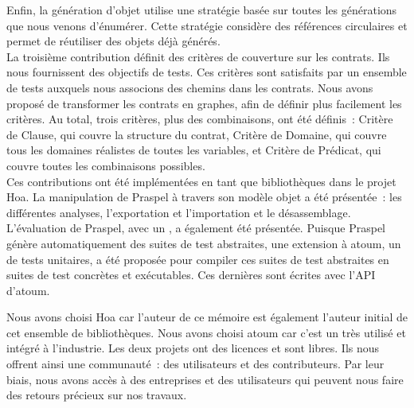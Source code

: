 Enfin, la génération d'objet utilise une stratégie basée sur toutes les
générations que nous venons d'énumérer. Cette stratégie considère des références
circulaires et permet de réutiliser des objets déjà générés. \\

La troisième contribution définit des critères de couverture sur les contrats.
Ils nous fournissent des objectifs de tests. Ces critères sont satisfaits par un
ensemble de tests auxquels nous associons des chemins dans les contrats. Nous
avons proposé de transformer les contrats en graphes, afin de définir plus
facilement les critères. Au total, trois critères, plus des combinaisons, ont
été définis~: Critère de Clause, qui couvre la structure du contrat, Critère de
Domaine, qui couvre tous les domaines réalistes de toutes les variables, et
Critère de Prédicat, qui couvre toutes les combinaisons possibles. \\

Ces contributions ont été implémentées en tant que bibliothèques dans le projet
Hoa. La manipulation de Praspel à travers son modèle objet a été présentée~: les
différentes analyses, l'exportation et l'importation et le désassemblage.
L'évaluation de Praspel, avec un , a
également été présentée. Puisque Praspel génère automatiquement des suites de
test abstraites, une extension à atoum, un  de tests
unitaires, a été proposée pour compiler ces suites de test abstraites en suites
de test concrètes et exécutables. Ces dernières sont écrites avec l'API d'atoum.

Nous avons choisi Hoa car l'auteur de ce mémoire est également l'auteur initial
de cet ensemble de bibliothèques. Nous avons choisi atoum car c'est un
 très utilisé et intégré à l'industrie. Les deux projets
ont des licences  et sont libres. Ils nous offrent ainsi
une communauté~: des utilisateurs et des contributeurs. Par leur biais, nous
avons accès à des entreprises et des utilisateurs qui peuvent nous faire des
retours précieux sur nos travaux. \\

